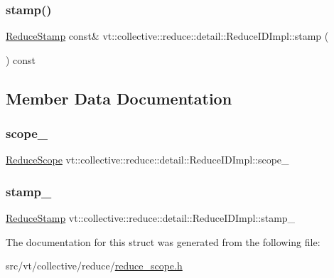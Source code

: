 \subsubsection{\texorpdfstring{stamp()}{stamp()}}
{\footnotesize\ttfamily \hyperlink{namespacevt_1_1collective_1_1reduce_1_1detail_aacc1fcd729d934ba143fee3a943bf9e7}{Reduce\+Stamp} const\& vt\+::collective\+::reduce\+::detail\+::\+Reduce\+I\+D\+Impl\+::stamp (\begin{DoxyParamCaption}{ }\end{DoxyParamCaption}) const\hspace{0.3cm}{\ttfamily [inline]}}



\subsection{Member Data Documentation}
\mbox{\label{structvt_1_1collective_1_1reduce_1_1detail_1_1_reduce_i_d_impl_afc9cc556d4e84fe7c41944102a926d59}} 
\subsubsection{\texorpdfstring{scope\+\_\+}{scope\_}}
{\footnotesize\ttfamily \hyperlink{structvt_1_1collective_1_1reduce_1_1detail_1_1_reduce_scope}{Reduce\+Scope} vt\+::collective\+::reduce\+::detail\+::\+Reduce\+I\+D\+Impl\+::scope\+\_\+\hspace{0.3cm}{\ttfamily [protected]}}

\mbox{\label{structvt_1_1collective_1_1reduce_1_1detail_1_1_reduce_i_d_impl_a84804f019298c0321847c09749ced0bb}} 
\subsubsection{\texorpdfstring{stamp\+\_\+}{stamp\_}}
{\footnotesize\ttfamily \hyperlink{namespacevt_1_1collective_1_1reduce_1_1detail_aacc1fcd729d934ba143fee3a943bf9e7}{Reduce\+Stamp} vt\+::collective\+::reduce\+::detail\+::\+Reduce\+I\+D\+Impl\+::stamp\+\_\+\hspace{0.3cm}{\ttfamily [protected]}}



The documentation for this struct was generated from the following file\+:\begin{DoxyCompactItemize}
\item 
src/vt/collective/reduce/\hyperlink{reduce__scope_8h}{reduce\+\_\+scope.\+h}\end{DoxyCompactItemize}
